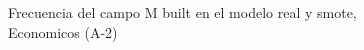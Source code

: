 \begin{figure}[H]
    \centering
    
    \caption{Frecuencia del campo M built en el modelo real y smote, Economicos (A-2)}
    \label{frecuency-M Built-smote-enc}
\end{figure}